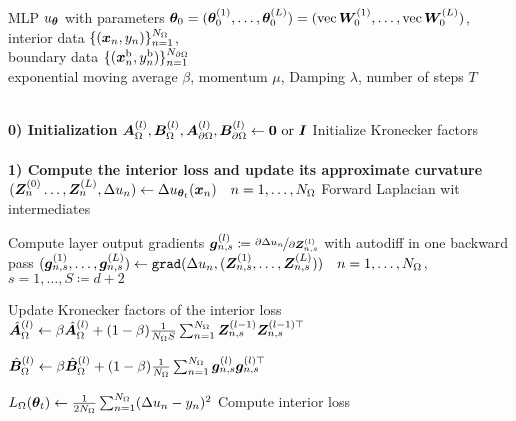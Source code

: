 \begin{algorithm}[!h]
  \centering
  \begin{small}
    \begin{algorithmic}
      \Require \\
      MLP $u_{{\bm{\theta}}}$ with parameters ${\bm{\theta}}_0 = ({\bm{\theta}}_0^{(1)}, \dots, {\bm{\theta}}_0^{(L)}) = (\operatorname{vec} {\bm{W}}_0^{(1)}, \dots, \operatorname{vec} {\bm{W}}_0^{(L)}) $, \\
      interior data $\{({\bm{x}}_n, y_n) \}_{n=1}^{N_{\Omega}}$, \\
      boundary data $\{({\bm{x}}^{\text{b}}_n, y^{\text{b}}_n) \}_{n=1}^{N_{\partial\Omega}}$ \\
      exponential moving average $\beta$, momentum $\mu$, Damping $\lambda$, number of steps $T$

      \\
      \State \textbf{0) Initialization}
        \State ${\bm{A}}_{\Omega}^{(l)}, {\bm{B}}_{\Omega}^{(l)}, {\bm{A}}_{\partial\Omega}^{(l)}, {\bm{B}}_{\partial\Omega}^{(l)} \gets {\bm{0}} \text{ or } {\bm{I}}$ \Comment Initialize Kronecker factors
      \EndFor
      \\
        \\
        \State \textbf{1) Compute the interior loss and update its approximate curvature}
        \State $({\bm{Z}}_n^{(0)}\dots, {\bm{Z}}_n^{(L)}, \Delta u_n) \gets \Delta u_{{\bm{\theta}}_t}({\bm{x}}_n)\quad n=1, \dots, N_{\Omega}$  \Comment Forward Laplacian wit intermediates

        \State Compute layer output gradients ${\bm{g}}^{(l)}_{n,s} \coloneqq \nicefrac{\partial \Delta u_n}{\partial{\bm{Z}}_{n,s}^{(l)}}$ with autodiff in one backward pass
        \State $({\bm{g}}_{n,s}^{(1)}, \dots, {\bm{g}}_{n,s}^{(L)}) \gets \texttt{grad}(\Delta u_n, ({\bm{Z}}_{n,s}^{(1)}, \dots, {\bm{Z}}_{n,s}^{(L)}))\quad n=1, \dots, N_{\Omega}$, \quad $s = 1, \dots, S \coloneqq d+2$

         \Comment Update Kronecker factors of the interior loss
          \State $\hat{{\bm{A}}}_{\Omega}^{(l)} \gets \beta \hat{{\bm{A}}}_{\Omega}^{(l)} + (1-\beta) \frac1{N_{\Omega} S} \sum_{n=1}^{N_{\Omega}} {\bm{Z}}_{n,s}^{(l-1)} {\bm{Z}}_{n,s}^{(l-1)\top}$

          \State $\hat{{\bm{B}}}_{\Omega}^{(l)} \gets \beta \hat{{\bm{B}}}_{\Omega}^{(l)} + (1-\beta) \frac1{N_{\Omega}} \sum_{n=1}^{N_{\Omega}} {\bm{g}}^{(l)}_{n,s} {\bm{g}}^{(l)\top}_{n,s}$
        \EndFor

        \State $L_{\Omega}({\bm{\theta}}_t) \gets \frac{1}{2 N_{\Omega}}\sum_{n=1}^{N_{\Omega}} (\Delta u_n - y_n)^2$ \Comment Compute interior loss


\end{algorithmic}
\end{small}
\end{algorithm}
